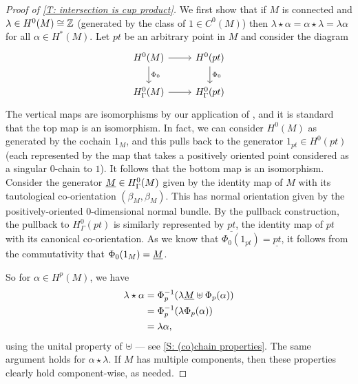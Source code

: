 \begin{proof}[Proof of \cref{T: intersection is cup product}]
	We first show that if $M$ is connected and $\lambda \in H^0(M) \cong \mathbb{Z}$ (generated by the class of $1 \in C^0(M)$) then $\lambda\star \alpha = \alpha\star \lambda = \lambda\alpha$ for all $\alpha \in H^*(M)$.
	Let $pt$ be an arbitrary point in $M$ and consider the diagram
	\[
	\begin{tikzcd}
		H^0(M) \arrow{r} \arrow[d, "\Phi_0"] & H^0(pt) \arrow[d, "\Phi_0"] \\
		H_\Gamma^0(M) \arrow{r} & H_\Gamma^0(pt)
	\end{tikzcd}
	\]
	The vertical maps are isomorphisms by our application of \cite[Theorem 10]{Krec10b}, and it is standard that the top map is an isomorphism.
	In fact, we can consider $H^0(M)$ as generated by the cochain $1_M$, and this pulls back to the generator $1_{pt} \in H^0(pt)$ (each represented by the map that takes a positively oriented point considered as a singular $0$-chain to $1$).
	It follows that the bottom map is an isomorphism.
	Consider the generator $\underline{M} \in H_\Gamma^0(M)$ given by the identity map of $M$ with its tautological co-orientation $(\beta_M,\beta_M)$.
	This has normal orientation given by the positively-oriented $0$-dimensional normal bundle.
	By the pullback construction, the pullback to $H^0_\Gamma(pt)$ is similarly represented by $\underline{pt}$, the identity map of $pt$ with its canonical co-orientation.
	As we know that $\Phi_0(1_{pt}) = \underline{pt}$, it follows from the commutativity that $\Phi_0(1_M) = \underline{M}$.

	So for $\alpha \in H^p(M)$, we have
	\begin{align*}
		\lambda \star \alpha
		& = \Phi_p^{-1}(\lambda\underline{M} \uplus \Phi_p(\alpha)) \\
		& = \Phi_p^{-1}(\lambda\Phi_p(\alpha)) \\
		& = \lambda\alpha,
	\end{align*}
	using the unital property of $\uplus$ --- see \cref{S: (co)chain properties}.
	The same argument holds for $\alpha\star \lambda$.
	If $M$ has multiple components, then these properties clearly hold component-wise, as needed.


\end{proof}

